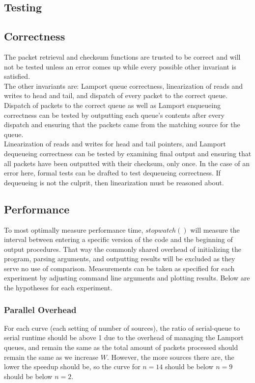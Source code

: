 \documentclass{article}
\begin{document}
\begin{adjustwidth}{-2cm}{-2cm}
\section{Testing}
\subsection{Correctness}
The packet retrieval and checksum functions are trusted to be correct and will not be tested unless an error comes up while every possible other invariant is satisfied.\\
The other invariants are: Lamport queue correctness, linearization of reads and writes to head and tail, and dispatch of every packet to the correct queue.\\ 
Dispatch of packets to the correct queue as well as Lamport enqueueing correctness can be tested by outputting each queue's contents after every dispatch and ensuring that the packets came from the matching source for the queue.\\
Linearization of reads and writes for head and tail pointers, and Lamport dequeueing correctness can be tested by examining final output and ensuring that all packets have been outputted with their checksum, only once. In the case of an error here, formal tests can be drafted to test dequeueing correctness. If dequeueing is not the culprit, then linearization must be reasoned about.
\subsection{Performance}
To most optimally measure performance time, $stopwatch()$ will measure the interval between entering a specific version of the code and the beginning of output procedures. That way the commonly shared overhead of initializing the program, parsing arguments, and outputting results will be excluded as they serve no use of comparison. Measurements can be taken as specified for each experiment by adjusting command line arguments and plotting results. Below are the hypotheses for each experiment.
\subsubsection{Parallel Overhead}
For each curve (each setting of number of sources), the ratio of serial-queue to serial runtime should be above 1 due to the overhead of managing the Lamport queues, and remain the same as the total amount of packets processed should remain the same as we increase $W$. However, the more sources there are, the lower the speedup should be, so the curve for $n=14$ should be below $n=9$ should be below $n=2$.

\end{adjustwidth}
\end{document}
